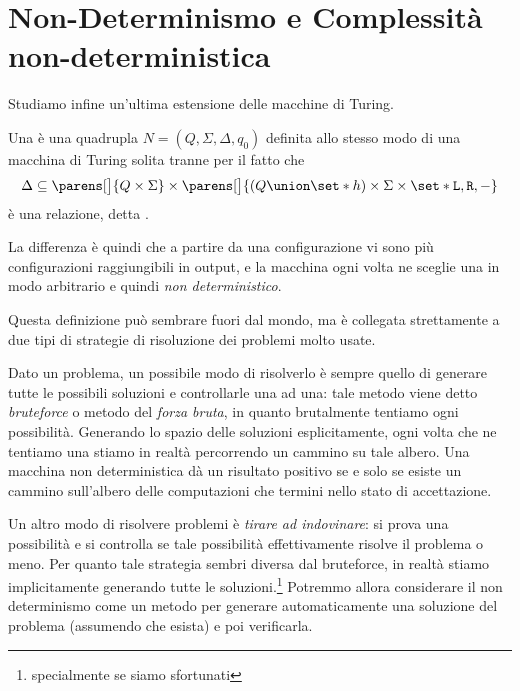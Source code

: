 \section{Non-Determinismo e Complessità non-deterministica}

Studiamo infine un'ultima estensione delle macchine di Turing.

\begin{definition}
    Una  è una quadrupla 
    $N = (Q, \Sigma, \Delta, q_0)$ definita allo stesso modo di una macchina di Turing
    solita tranne per il fatto che \[
        \Delta  \subseteq 
            \parens[\big]{Q \times \Sigma} \times
            \parens[\big]{(Q \union \set*{h}) \times \Sigma \times \set*{\Left, \Right, \blank}}
    \] è una relazione, detta .
\end{definition}

La differenza è quindi che a partire da una configurazione vi sono più configurazioni
raggiungibili in output, e la macchina ogni volta ne sceglie una in modo arbitrario
e quindi \emph{non deterministico}.

Questa definizione può sembrare fuori dal mondo, ma è collegata strettamente a due tipi
di strategie di risoluzione dei problemi molto usate.

Dato un problema, un possibile modo di risolverlo è sempre quello di generare tutte le
possibili soluzioni e controllarle una ad una: tale metodo viene detto \emph{bruteforce} o
metodo del \emph{forza bruta}, in quanto brutalmente tentiamo ogni possibilità.
Generando lo spazio delle soluzioni esplicitamente, ogni volta che ne tentiamo una stiamo in
realtà percorrendo un cammino su tale albero.
Una macchina non deterministica dà un risultato positivo se e solo se esiste
un cammino sull'albero delle computazioni che termini nello stato di accettazione.

Un altro modo di risolvere problemi è \emph{tirare ad indovinare}: si prova 
una possibilità e si controlla se tale possibilità effettivamente risolve il
problema o meno.
Per quanto tale strategia sembri diversa dal bruteforce, in realtà stiamo 
implicitamente generando tutte le soluzioni.\footnote{specialmente se siamo sfortunati}
Potremmo allora considerare il non determinismo come un metodo per generare
automaticamente una soluzione del problema (assumendo che esista) e poi verificarla.

